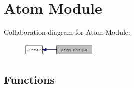 \hypertarget{group__atommod}{
\section{Atom Module}
\label{group__atommod}
}


Collaboration diagram for Atom Module:\nopagebreak
\begin{figure}[H]
\begin{center}
\leavevmode
\includegraphics[width=105pt]{group__atommod}
\end{center}
\end{figure}
\subsection*{Functions}
